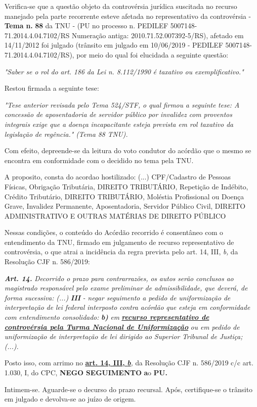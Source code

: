 \documentclass[12pt]{article}
\begin{document}
\justifying
\noindent Verifica-se que a questão objeto da controvérsia jurídica suscitada no recurso manejado pela parte recorrente esteve afetada no representativo da controvérsia - \textbf{Tema n. }\textbf{88} da TNU - (PU no processo n. PEDILEF 5007148-71.2014.4.04.7102/RS Numeração antiga: 2010.71.52.007392-5/RS),  afetado em 14/11/2012 foi julgado (trânsito em julgado em 10/06/2019 - PEDILEF 5007148-71.2014.4.04.7102/RS), por meio do qual foi elucidada a seguinte questão:

\noindent \textit{"Saber se o rol do art. 186 da Lei n. 8.112/1990 é taxativo ou exemplificativo."}

\noindent Restou firmada a seguinte tese:

\noindent \textit{"Tese anterior revisada pelo Tema 524/STF, o qual firmou a seguinte tese: A concessão de aposentadoria de servidor público por invalidez com proventos integrais exige que a doença incapacitante esteja prevista em rol taxativo da legislação de regência." (Tema 88 TNU).}

\noindent Com efeito, depreende-se da leitura do voto condutor do acórdão que o mesmo se encontra em conformidade com o decidido no  tema pela TNU.

\noindent A proposito, consta do acordao hostilizado: (...) CPF/Cadastro de Pessoas Físicas, Obrigação Tributária, DIREITO TRIBUTÁRIO, Repetição de Indébito, Crédito Tributário, DIREITO TRIBUTÁRIO, Moléstia Profissional ou Doença Grave, Invalidez Permanente, Aposentadoria, Servidor Público Civil, DIREITO ADMINISTRATIVO E OUTRAS MATÉRIAS DE DIREITO PÚBLICO

\noindent Nessas condições, o conteúdo do Acórdão recorrido é consentâneo com o entendimento da TNU, firmado em julgamento de recurso representativo de controvérsia, o que atrai a incidência da regra prevista pelo art. 14, III, \textit{b,} da Resolução CJF n. 586/2019:

\noindent \textit{\textbf{Art. 14.}}\textit{ Decorrido o prazo para contrarrazões, os autos serão conclusos ao magistrado responsável pelo exame preliminar de admissibilidade, que deverá, de forma sucessiva: (...) }\textit{\textbf{III }}\textit{- negar seguimento a pedido de uniformização de interpretação de lei federal interposto contra acórdão que esteja em conformidade com entendimento consolidado: }\textit{\textbf{b)}}\textit{ em }\uline{\textit{\textbf{recurso representativo de controvérsia pela Turma Nacional de Uniformização}}}\textit{ ou em pedido de uniformização de interpretação de lei dirigido ao Superior Tribunal de Justiça;(...).}

\noindent Posto isso, com arrimo no \uline{\textbf{art. 14, III, }}\uline{\textit{\textbf{b}}}\textit{,} da Resolução CJF n. 586/2019 c/c art. 1.030, I, do CPC, \textbf{NEGO SEGUIMENTO }\textbf{a}o\textbf{ PU}\textbf{.}

\noindent Intimem-se. Aguarde-se o decurso do prazo recursal. Após, certifique-se o trânsito em julgado e devolva-se ao juízo de origem.
\end{document}
